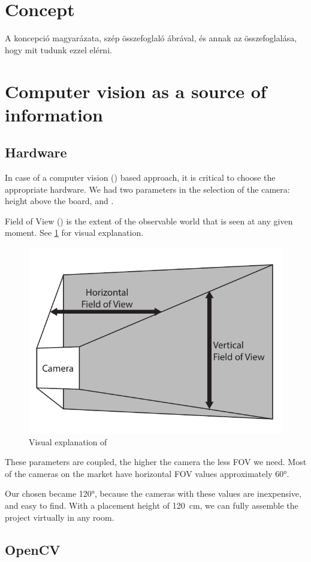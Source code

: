 \section{Concept}
	A koncepció magyarázata, szép összefoglaló ábrával, és annak az összefoglalása, hogy mit tudunk ezzel elérni.

\section{Computer vision as a source of information}

\subsection{Hardware}
\label{sec:case_study:hardware}

In case of a computer vision () based approach, it is critical to choose the appropriate hardware. We had two parameters in the selection of the camera: height above the board, and .

	Field of View () is the extent of the observable world that is seen at any given moment. See \cref{fig:case_study:fov} for visual explanation.

\begin{figure}[h]
	\centering
	\includegraphics[width=0.5\linewidth]{include/figures/chapter_6/opencv_1}
	\caption{Visual explanation of }
	\label{fig:case_study:fov}
\end{figure}

These parameters are coupled, the higher the camera the less FOV we need. Most of the cameras on the market have horizontal FOV values approximately \ang{60}.

Our chosen  became \ang{120}, because the cameras with these  values are inexpensive, and easy to find. With a placement height of 120~\si{\centi\meter}, we can fully assemble the project virtually in any room.

\subsection{OpenCV}

